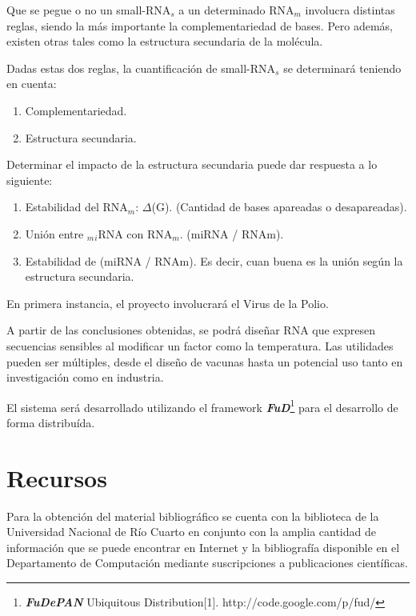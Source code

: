\documentclass[12pt,a4paper]{article}
\begin{document}
\par Que se pegue o no un small-RNA$_s$ a un determinado RNA$_m$ involucra distintas reglas, siendo la más importante la complementariedad de bases. Pero además, existen otras tales como la estructura secundaria de la molécula.

\par Dadas estas dos reglas, la cuantificación de small-RNA$_s$ se determinará teniendo en cuenta:
\begin{enumerate}
	\item Complementariedad.
	\item Estructura secundaria.
\end{enumerate}

Determinar el impacto de la estructura secundaria puede dar respuesta a lo siguiente:
\begin{enumerate}
	\item Estabilidad del RNA$_m$: $\Delta$(G). (Cantidad de bases apareadas o desapareadas).
	\item Unión entre $_m$$_i$RNA con RNA$_m$. (miRNA / RNAm).
	\item Estabilidad de (miRNA / RNAm). Es decir, cuan buena es la unión según la estructura secundaria.
\end{enumerate}
En primera instancia, el proyecto involucrará el Virus de la Polio.

\par A partir de las conclusiones obtenidas, se podrá diseñar RNA que expresen secuencias sensibles al modificar un factor como la temperatura. Las utilidades pueden ser múltiples, desde el diseño de vacunas hasta un potencial uso tanto en investigación como en industria.	

\par El sistema será desarrollado utilizando el framework \textbf{\textit{FuD}}\footnote{\textbf{\textit{FuDePAN}} Ubiquitous Distribution[1]. http://code.google.com/p/fud/} para el desarrollo de forma distribuída.

\section{Recursos}

\par Para la obtención del material bibliográfico se cuenta con la biblioteca de la Universidad Nacional de Río Cuarto en conjunto con la amplia cantidad de información que se puede encontrar en Internet y la bibliografía disponible en el Departamento de Computación mediante suscripciones a publicaciones científicas.
\end{document}
